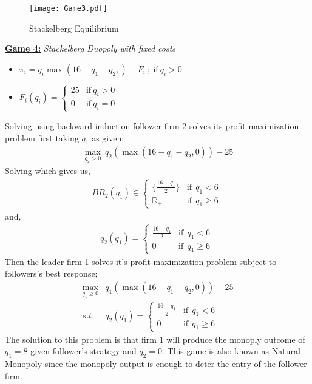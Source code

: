 \documentclass[10pt,leqno]{report}
\begin{document}
\begin{figure}[H]
    \centering
     \texttt{[image: Game3.pdf]}
    \caption{Stackelberg Equilibrium }
\end{figure} 
\pagebreak
\textbf{\underline{Game 4:}} \textit{Stackelberg Duopoly with fixed costs} \\
\begin{tcolorbox}
    \begin{itemize}
        \item \(\pi_{i}=q_{i}\max(16-q_{1}-q_{2},)-F_{i}\ ; \ \text{if} \ q_{i}>0\)
        \item \(F_{i}(q_{i})=\begin{cases}
            25 & \text{if} \ q_{i}>0 \\
            0 & \text{if} \ q_{i}=0
        \end{cases}\)
    \end{itemize}
\end{tcolorbox}
Solving using backward induction follower firm 2 solves its profit maximization problem first taking \(q_{1}\) as given;\\
\begin{align*}
    \max_{q_{2}>0} \ q_{2}(\max(16-q_{1}-q_{2},0))-25 
\end{align*}
Solving which gives us, \\
\begin{eqnarray*}
    BR_{2}(q_{1})\in \begin{cases}
        \{\frac{16-q_{1}}{2}\} &  \text{if} \ \ q_{1} < 6\ \\
        \mathbb{R}_{+}  & \text{if} \ \ q_{1}\geq 6
    \end{cases}
\end{eqnarray*}
and, 
\begin{eqnarray*}
    q_{2}(q_{1})=\begin{cases}
        \frac{16-q_{1}}{2} &  \text{if} \ \ q_{1} < 6\ \\
        0  & \text{if} \ \ q_{1}\geq 6
    \end{cases}
\end{eqnarray*}
Then the leader firm 1 solves it's profit maximization problem subject to followers's best response;
\begin{eqnarray*}
    \max_{q_{1}\geq 0} & q_{1}(\max(16-q_{1}-q_{2},0))-25 \\
    s.t. & q_{2}(q_{1})=\begin{cases}
        \frac{16-q_{1}}{2} &  \text{if} \ \ q_{1} < 6 \\
        0  & \text{if} \ \ q_{1}\geq 6
    \end{cases} 
\end{eqnarray*}
The solution to this problem is that firm 1 will produce the monoply outcome of \(q_{1}=8\) given follower's strategy and \(q_{2}=0\). This game is also known as Natural Monopoly since the monopoly output is enough to deter the entry of the follower firm. 
\linebreak
\end{document}

